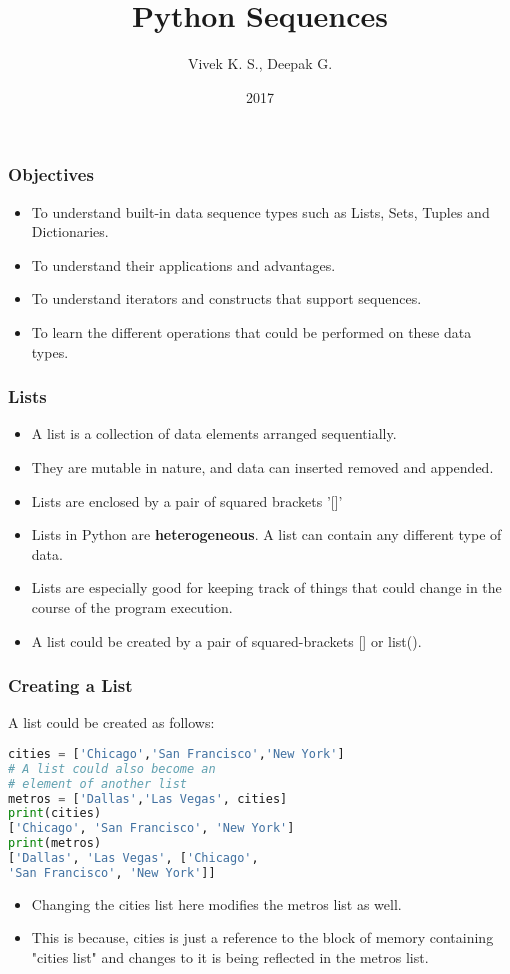 \documentclass{beamer}
\title{Python Sequences}
\author{Vivek K. S., Deepak G.}
\institute{Information Systems Decision Sciences (ISDS)\\
MUMA College of Business\\
University of South Florida \\
Tampa, Florida}
\date{2017}
\begin{document}
\frame{\titlepage}
\begin{frame}
\frametitle{Objectives}
\begin{itemize}
\item To understand built-in data sequence types such as Lists, Sets, Tuples and Dictionaries.
\item To understand their applications and advantages.
\item To understand iterators and constructs that support sequences.
\item To learn the different operations that could be performed on these data types.
\end{itemize}
\end{frame}
\begin{frame}
\frametitle{Lists}
\begin{itemize}
\item A list is a collection of data elements arranged sequentially.
\item They are mutable in nature, and data can inserted removed and appended.
\item Lists are enclosed by a pair of squared brackets '[]'
\item Lists in Python are \textbf{heterogeneous}. A list can contain any different type of data.
\item Lists are especially good for keeping track of things that could change in the course of the program execution.
\item A list could be created by a pair of squared-brackets [] or list().
\end{itemize}
\end{frame}


\begin{frame}[fragile]
\frametitle{Creating a List}
A list could be created as follows:
\begin{lstlisting}[language=Python]
cities = ['Chicago','San Francisco','New York']
# A list could also become an 
# element of another list 
metros = ['Dallas','Las Vegas', cities]
print(cities)
['Chicago', 'San Francisco', 'New York']
print(metros)
['Dallas', 'Las Vegas', ['Chicago', 
'San Francisco', 'New York']]
\end{lstlisting}
\begin{itemize}
\item Changing the cities list here modifies the  metros list as well.
\item This is because, cities is just a reference to the block of memory containing "cities list" and changes to it is being reflected in the metros list.
\end{itemize}
\end{frame}
\end{document}
